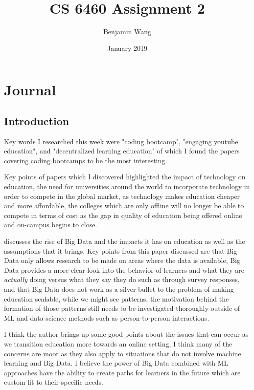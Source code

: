 \documentclass[
	letterpaper, %
]{jdf}
\author{Benjamin Wang}
\title{CS 6460 Assignment 2}
\date{January 2019}
\begin{document}

\maketitle

\section{Journal}
\subsection{Introduction}

Key words I researched this week were "coding bootcamp", "engaging youtube education", and "decentralized learning education" of which I found the papers covering coding bootcamps to be the most interesting. 

Key points of papers which I discovered highlighted the impact of technology on education, the need for universities around the world to incorporate technology in order to compete in the global market, as technology makes education cheaper and more affordable, the colleges which are only offline will no longer be able to compete in terms of cost as the gap in quality of education being offered online and on-campus begins to close.

\citep{1} discusses the rise of Big Data and the impacts it has on education as well as the assumptions that it brings. Key points from this paper discussed are that Big Data only allows research to be made on areas where the data is available, Big Data provides a more clear look into the behavior of learners and what they are \emph{actually} doing versus what they say they do such as through survey responses, and that Big Data does not work as a silver bullet to the problem of making education scalable, while we might see patterns, the motivation behind the formation of those patterns still needs to be investigated thoroughly outside of ML and data science methods such as person-to-person interactions. 

I think the author brings up some good points about the issues that can occur as we transition education more towards an online setting, I think many of the concerns are moot as they also apply to situations that do not involve machine learning and Big Data. I believe the power of Big Data combined with ML approaches have the ability to create paths for learners in the future which are custom fit to their specific needs.
\end{document}
